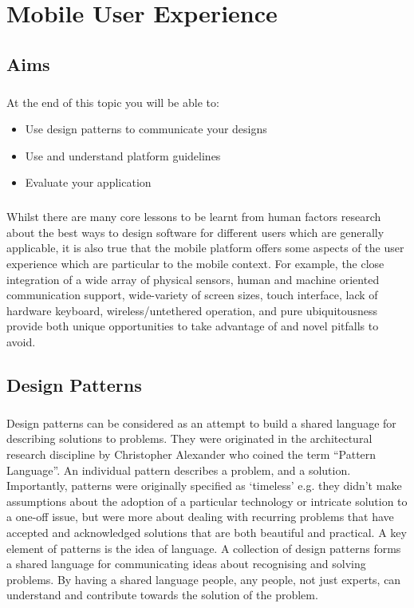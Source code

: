 \chapter{Mobile User Experience}

\section{Aims}
\paragraph{} At the end of this topic you will be able to:

\begin{itemize}
\item Use design patterns to communicate your designs
\item Use and understand platform guidelines
\item Evaluate your application
\end{itemize}

\paragraph{} Whilst there are many core lessons to be learnt from human factors research about the best ways to design software for different users which are generally applicable, it is also true that the mobile platform offers some aspects of the user experience which are particular to the mobile context. For example, the close integration of a wide array of physical sensors, human and machine oriented communication support, wide-variety of screen sizes, touch interface, lack of hardware keyboard, wireless/untethered operation, and pure ubiquitousness provide both unique opportunities to take advantage of and novel pitfalls to avoid.


\section{Design Patterns}
\paragraph{} Design patterns can be considered as an attempt to build a shared language for describing solutions to problems. They were originated in the architectural research discipline by Christopher Alexander who coined the term ``Pattern Language''. An individual pattern describes a problem, and a solution. Importantly, patterns were originally specified as `timeless' e.g. they didn't make assumptions about the adoption of a particular technology or intricate solution to a one-off issue, but were more about dealing with recurring problems that have accepted and acknowledged solutions that are both beautiful and practical. A key element of patterns is the idea of language. A collection of design patterns forms a shared language for communicating ideas about recognising and solving problems. By having a shared language people, any people, not just experts, can understand and contribute towards the solution of the problem.

